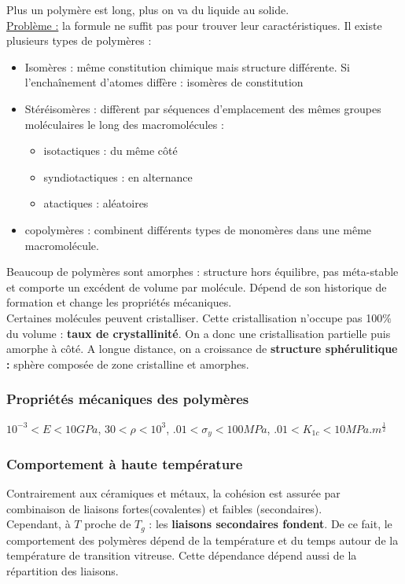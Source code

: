 \documentclass[../main.tex]{subfiles}
\begin{document}
Plus un polymère est long, plus on va du liquide au solide. \\

\quad \underline{Problème :} la formule ne suffit pas pour trouver leur caractéristiques. Il existe plusieurs types de polymères : \\
\begin{itemize}
    \item Isomères : même constitution chimique mais structure différente. Si l'enchaînement d'atomes diffère : isomères de constitution\\
    \item Stéréisomères : diffèrent par séquences d'emplacement des mêmes groupes moléculaires le long des macromolécules : \begin{itemize}
        \item isotactiques : du même côté\\
        \item syndiotactiques : en alternance\\
        \item atactiques : aléatoires \\
    \end{itemize}
    \item copolymères : combinent différents types de monomères dans une même macromolécule.\\
\end{itemize}

\warning Beaucoup de polymères sont amorphes : structure hors équilibre, pas méta-stable et comporte un excédent de volume par molécule. Dépend de son historique de formation et change les propriétés mécaniques.\\

\warning Certaines molécules peuvent cristalliser. Cette cristallisation n'occupe pas 100$\%$ du volume : \textbf{taux de crystallinité}. On a donc une cristallisation partielle puis amorphe à côté. A longue distance, on a croissance de \textbf{structure sphérulitique :} sphère composée de zone cristalline et amorphes.\\

\subsubsection{Propriétés mécaniques des polymères}
$10^{-3} < E < 10 GPa$, $30 < \rho < 10^3$, $.01 < \sigma_y < 100MPa$, $.01 < K_{1c} < 10MPa.m^{\frac{1}{2}}$

\subsubsection{Comportement à haute température}
Contrairement aux céramiques et métaux, la cohésion est assurée par combinaison de liaisons fortes(covalentes) et faibles (secondaires).\\
Cependant, à $T$ proche de $T_g$ : les \textbf{liaisons secondaires fondent}. De ce fait, le comportement des polymères dépend de la température et du temps autour de la température de transition vitreuse. Cette dépendance dépend aussi de la répartition des liaisons.\\
\end{document}
